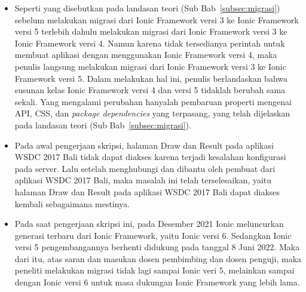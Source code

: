 \begin{itemize}
	\item Seperti yang disebutkan pada landasan teori (Sub Bab~\ref{subsec:migrasi}) sebelum melakukan migrasi dari Ionic Framework versi 3 ke Ionic Framework versi 5 terlebih dahulu melakukan migrasi dari Ionic Framework versi 3 ke Ionic Framework versi 4. Namun karena tidak tersedianya perintah untuk membuat aplikasi dengan menggunakan Ionic Framework versi 4, maka penulis langsung melakukan migrasi dari Ionic Framework versi 3 ke Ionic Framework versi 5. Dalam melakukan hal ini, penulis berlandaskan bahwa susunan kelas Ionic Framework versi 4 dan versi 5 tidaklah berubah sama sekali. Yang mengalami perubahan hanyalah pembaruan properti mengenai API, CSS, dan {\it package dependencies} yang terpasang, yang telah dijelaskan pada landasan teori (Sub Bab~\ref{subsec:migrasi}).
	
	\item Pada awal pengerjaan skripsi, halaman Draw dan Result pada aplikasi WSDC 2017 Bali tidak dapat diakses karena terjadi kesalahan konfigurasi pada server. Lalu setelah menghubungi dan dibantu oleh pembuat dari aplikasi WSDC 2017 Bali, maka masalah ini telah terselesaikan, yaitu halaman Draw dan Result pada aplikasi WSDC 2017 Bali dapat diakses kembali sebagaimana mestinya.
	
	\item Pada saat pengerjaan skripsi ini, pada Desember 2021 Ionic meluncurkan generasi terbaru dari Ionic Framework, yaitu Ionic versi 6. Sedangkan Ionic versi 5 pengembangannya berhenti didukung pada tanggal 8 Juni 2022. Maka dari itu, atas saran dan masukan dosen pembimbing dan dosen penguji, maka peneliti melakukan migrasi tidak lagi sampai Ionic veri 5, melainkan sampai dengan Ionic versi 6 untuk masa dukungan Ionic Framework yang lebih lama.
	
\end{itemize}
